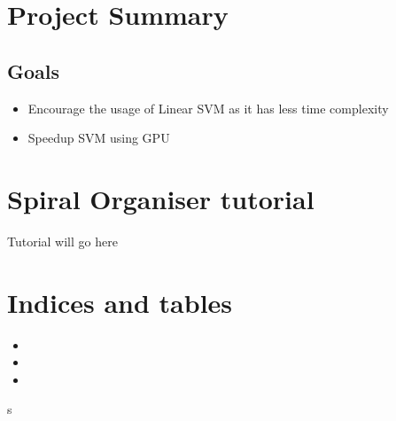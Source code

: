\documentclass[letterpaper,10pt,english]{sphinxmanual}
\begin{document}
\chapter{Project Summary}
\label{\detokenize{project:project-summary}}\label{\detokenize{project::doc}}

\section{Goals}
\label{\detokenize{project:goals}}\begin{itemize}
\item {} 
Encourage the usage of Linear SVM as it has less time complexity

\item {} 
Speedup SVM using GPU

\end{itemize}


\chapter{Spiral Organiser tutorial}
\label{\detokenize{tutorial:spiral-organiser-tutorial}}\label{\detokenize{tutorial::doc}}
Tutorial will go here


\chapter{Indices and tables}
\label{\detokenize{index:indices-and-tables}}\begin{itemize}
\item {} 

\item {} 

\item {} 

\end{itemize}


\renewcommand{\indexname}{Python Module Index}
\begin{sphinxtheindex}
\def\bigletter#1{{\Large\sffamily#1}\nopagebreak\vspace{1mm}}
\bigletter{s}
\item {}
\end{sphinxtheindex}

\renewcommand{\indexname}{Index}
\printindex
\end{document}
